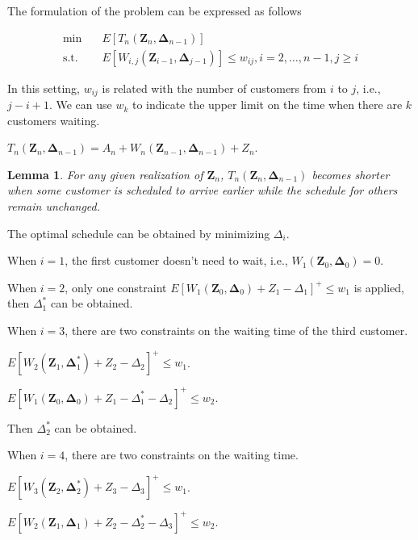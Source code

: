 \documentclass{article}
\newcommand{\Z}{\mathbf{Z}}
\newcommand{\D}{\bm{\Delta}}
\newtheorem{lemma}{\hspace{2em}Lemma}
\begin{document}
The formulation of the problem can be expressed as follows

\begin{equation}\label{joint_waiting}
    \begin{aligned}
        \min \quad & E \left[T_n(\Z_{n}, \D_{n-1}) \right] \\
        \mbox{s.t.} \quad & E\left[W_{i,j}(\Z_{i-1}, \D_{j-1}) \right] \leq w_{ij}, i =2, \ldots, n-1, j \geq i
    \end{aligned}
\end{equation}


In this setting, $w_{ij}$ is related with the number of customers from $i$ to $j$, i.e., $j-i +1$. We can use $w_{k}$ to indicate the upper limit on the time when there are $k$ customers waiting.

$T_{n}(\Z_{n}, \D_{n-1}) = A_{n} + W_{n}(\Z_{n-1}, \D_{n-1}) + Z_{n}$.

\begin{lemma}
For any given realization of $\Z_{n}$, $T_n(\Z_{n}, \D_{n-1})$ becomes shorter when some customer is scheduled to arrive earlier while the schedule for others remain unchanged.
\end{lemma}

The optimal schedule can be obtained by minimizing $\Delta_{i}$.

When $i =1$, the first customer doesn't need to wait, i.e., $W_{1}(\Z_{0}, \D_{0}) = 0$.

When $i =2$, only one constraint $E\left[W_{1}(\Z_{0}, \D_{0}) + Z_{1}- \Delta_{1} \right]^{+} \leq w_{1}$ is applied, then $\Delta_{1}^{*}$ can be obtained. 

When $i =3$, there are two constraints on the waiting time of the third customer.

$E\left[W_{2}(\Z_{1}, \D_{1}^{*}) + Z_{2} - \Delta_{2}\right]^{+} \leq w_{1}$.

$E\left[W_{1}(\Z_{0}, \D_{0}) + Z_{1} - \Delta_{1}^{*} - \Delta_{2}\right]^{+} \leq w_{2}$.

Then $\Delta_{2}^{*}$ can be obtained.

When $i =4$, there are two constraints on the waiting time.

$E\left[W_{3}(\Z_{2}, \D_{2}^{*}) + Z_{3} - \Delta_{3}\right]^{+} \leq w_{1}$.

$E\left[W_{2}(\Z_{1}, \D_{1}) + Z_{2} - \Delta_{2}^{*} - \Delta_{3}\right]^{+} \leq w_{2}$.

\end{document}
